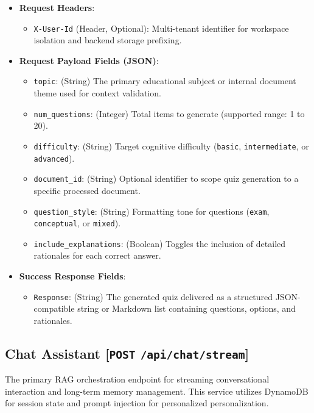 \begin{itemize}
    \item \textbf{Request Headers}:
    \begin{itemize}
        \item \texttt{X-User-Id} (Header, Optional): Multi-tenant identifier for workspace isolation and backend storage prefixing.
    \end{itemize}
    \item \textbf{Request Payload Fields (JSON)}:
    \begin{itemize}
        \item \texttt{topic}: (String) The primary educational subject or internal document theme used for context validation.
        \item \texttt{num\_questions}: (Integer) Total items to generate (supported range: 1 to 20).
        \item \texttt{difficulty}: (String) Target cognitive difficulty (\texttt{basic}, \texttt{intermediate}, or \texttt{advanced}).
        \item \texttt{document\_id}: (String) Optional identifier to scope quiz generation to a specific processed document.
        \item \texttt{question\_style}: (String) Formatting tone for questions (\texttt{exam}, \texttt{conceptual}, or \texttt{mixed}).
        \item \texttt{include\_explanations}: (Boolean) Toggles the inclusion of detailed rationales for each correct answer.
    \end{itemize}
    \item \textbf{Success Response Fields}:
    \begin{itemize}
        \item \texttt{Response}: (String) The generated quiz delivered as a structured JSON-compatible string or Markdown list containing questions, options, and rationales.
    \end{itemize}
\end{itemize}

\subsection{Chat Assistant [\texttt{POST} \texttt{/api/chat/stream}]}
The primary RAG orchestration endpoint for streaming conversational interaction and long-term memory management. This service utilizes DynamoDB for session state and prompt injection for personalized personalization.

